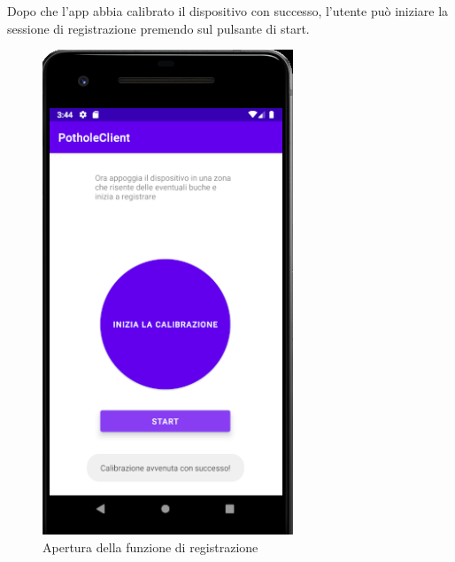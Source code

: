 \documentclass[a4paper,11pt]{report}
\begin{document}
\newpage 
Dopo che l'app abbia calibrato il dispositivo con successo, l'utente può iniziare la sessione di registrazione premendo sul pulsante di start.\newline
\begin{figure} [H]
\centering
\includegraphics[scale = 0.65]{start_recording_screen}
\caption{Apertura della funzione di registrazione}
\end{figure}
\end{document}

